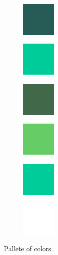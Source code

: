 \begin{figure}[h]
\begin{subfigure}{0.1075\textwidth}
	\end{subfigure} \\
	\begin{subfigure}{0.1075\textwidth}
		\centering
		\includegraphics[scale=1, frame]{gui-imgs/R0G204B153A64}
	\end{subfigure}
	\begin{subfigure}{0.1075\textwidth}
		\centering
		\includegraphics[scale=1, frame]{gui-imgs/R0G204B153A255}
	\end{subfigure}
	\begin{subfigure}{0.1075\textwidth}
		\centering
		\includegraphics[scale=1, frame]{gui-imgs/R102G255B102A64}
	\end{subfigure}
	\begin{subfigure}{0.1075\textwidth}
		\centering
		\includegraphics[scale=1, frame]{gui-imgs/R102G255B102A255}
	\end{subfigure}
	\begin{subfigure}{0.1075\textwidth}
		\centering
		\includegraphics[scale=1, frame]{gui-imgs/R0G204B153A255}
	\end{subfigure}
	\begin{subfigure}{0.1075\textwidth}
		\centering
		\includegraphics[scale=1]{gui-imgs/R255G255B255A255}
	\end{subfigure}
	\caption{Pallete of colors}
\end{figure}

